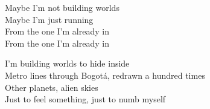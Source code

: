 \begin{lyrics}
Maybe I'm not building worlds\\
Maybe I'm just running\\
From the one I'm already in\\
From the one I'm already in

I'm building worlds to hide inside\\
Metro lines through Bogotá, redrawn a hundred times\\
Other planets, alien skies\\
Just to feel something, just to numb myself
\end{lyrics}

